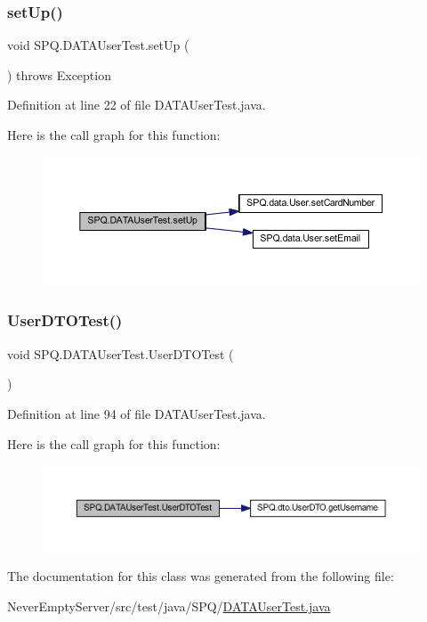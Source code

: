 \subsubsection{\texorpdfstring{set\+Up()}{setUp()}}
{\footnotesize\ttfamily void S\+P\+Q.\+D\+A\+T\+A\+User\+Test.\+set\+Up (\begin{DoxyParamCaption}{ }\end{DoxyParamCaption}) throws Exception}



Definition at line 22 of file D\+A\+T\+A\+User\+Test.\+java.

Here is the call graph for this function\+:
\nopagebreak
\begin{figure}[H]
\begin{center}
\leavevmode
\includegraphics[width=350pt]{class_s_p_q_1_1_d_a_t_a_user_test_a703753b88018d83f5a2d3b76d335889a_cgraph}
\end{center}
\end{figure}
\mbox{\label{class_s_p_q_1_1_d_a_t_a_user_test_a4feb113d2b2971c37851e1b6bddca741}} 
\subsubsection{\texorpdfstring{User\+D\+T\+O\+Test()}{UserDTOTest()}}
{\footnotesize\ttfamily void S\+P\+Q.\+D\+A\+T\+A\+User\+Test.\+User\+D\+T\+O\+Test (\begin{DoxyParamCaption}{ }\end{DoxyParamCaption})}



Definition at line 94 of file D\+A\+T\+A\+User\+Test.\+java.

Here is the call graph for this function\+:
\nopagebreak
\begin{figure}[H]
\begin{center}
\leavevmode
\includegraphics[width=350pt]{class_s_p_q_1_1_d_a_t_a_user_test_a4feb113d2b2971c37851e1b6bddca741_cgraph}
\end{center}
\end{figure}


The documentation for this class was generated from the following file\+:\begin{DoxyCompactItemize}
\item 
Never\+Empty\+Server/src/test/java/\+S\+P\+Q/\mbox{\hyperlink{_d_a_t_a_user_test_8java}{D\+A\+T\+A\+User\+Test.\+java}}\end{DoxyCompactItemize}
